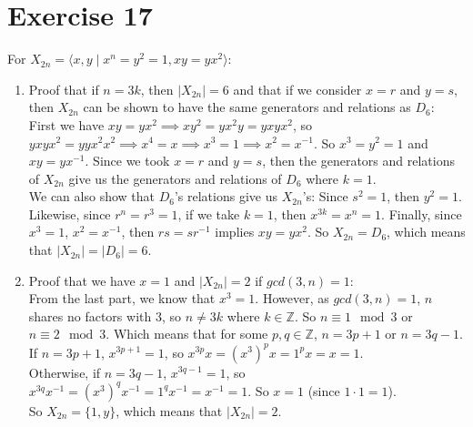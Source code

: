 \documentclass[12pt]{article}
\newcommand{\Z}{\mathbb{Z}}
\begin{document}
    \section*{Exercise 17}
    For $X_{2n} = \langle x, y \mid x^n = y^2 = 1, xy = yx^2 \rangle$: \\
    \begin{enumerate}[label=\textbf{\alph*.}]
        \item 
            Proof that if $n = 3k$, then $|X_{2n}| = 6$
            and that if we consider $x = r$ and $y = s$,
            then $X_{2n}$ can be shown to have the same generators and 
            relations as $D_6$: \\
            First we have $xy = yx^2
            \implies xy^2 = yx^2y = yxyx^2$,
            so $yxyx^2 = yyx^2x^2 \implies
            x^4 = x
            \implies x^3 = 1
            \implies x^2 = x^{-1}$.
            So $x^3 = y^2 = 1$ and $xy = yx^{-1}$.
            Since we took $x = r$ and $y = s$,
            then the generators and relations of $X_{2n}$ give us the
            generators and relations of $D_6$ where $k = 1$. \\
            We can also show that $D_6$'s relations give us $X_{2n}$'s:
            Since $s^2 = 1$, then $y^2 = 1$.
            Likewise, since $r^n = r^3 = 1$,
            if we take $k = 1$,
            then $x^{3k} = x^n = 1$.
            Finally, since $x^3 = 1$, $x^2 = x^{-1}$,
            then $rs = sr^{-1}$ implies $xy = yx^{2}$.
            So $X_{2n} = D_6$,
            which means that $|X_{2n}| = |D_6| = 6$.
        \item 
            Proof that we have $x = 1$ and $|X_{2n}| = 2$
            if $gcd(3, n) = 1$: \\
            From the last part, we know that $x^3 = 1$.
            However, as $gcd(3, n) = 1$, $n$ shares no factors with 3,
            so $n \neq 3k$ where $k \in \Z$.
            So $n \equiv 1 \mod 3$ or $n \equiv 2 \mod 3$. 
            Which means that for some $p, q \in \Z$,
            $n = 3p + 1$ or $n = 3q - 1$. \\
            If $n = 3p + 1$, $x^{3p + 1} = 1$,
            so $x^{3p}x = (x^3)^px = 1^px = x = 1$. \\
            Otherwise, if $n = 3q - 1$, $x^{3q - 1} = 1$,
            so $x^{3q}x^{-1} = (x^3)^qx^{-1} = 1^qx^{-1} = x^{-1} = 1$.
            So $x = 1$ (since $1 \cdot 1 = 1$). \\
            So $X_{2n} = \{1, y\}$,
            which means that $|X_{2n}| = 2$.
    \end{enumerate}   
\end{document}
